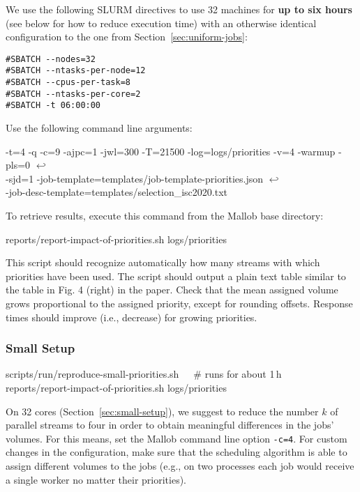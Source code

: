\documentclass[runningheads]{article}
\newcommand{\CR}{{\tiny$\hookleftarrow$}}
\numberwithin{dummy}{subsection}
\begin{document}
We use the following SLURM directives to use 32 machines for \textbf{up to six hours} (see below for how to reduce execution time) with an otherwise identical configuration to the one from Section~\ref{sec:uniform-jobs}:

\begin{verbatim}
#SBATCH --nodes=32
#SBATCH --ntasks-per-node=12
#SBATCH --cpus-per-task=8
#SBATCH --ntasks-per-core=2
#SBATCH -t 06:00:00
\end{verbatim}

Use the following command line arguments:

\begin{ttfenv}
-t=4 -q -c=9 -ajpc=1 -jwl=300 -T=21500 -log=logs/priorities -v=4 -warmup -pls=0 \CR\\
-sjd=1 -job-template=templates/job-template-priorities.json \CR\\
 -job-desc-template=templates/selection\_isc2020.txt
\end{ttfenv}

To retrieve results, execute this command from the Mallob base directory:
\begin{ttfenv}
reports/report-impact-of-priorities.sh logs/priorities
\end{ttfenv}

 This script should recognize automatically how many streams with which priorities have been used.
The script should output a plain text table similar to the table in Fig. 4 (right) in the paper.
Check that the mean assigned volume grows proportional to the assigned priority, except for rounding offsets.
Response times should improve (i.e., decrease) for growing priorities.

\subsubsection{Small Setup}

\begin{tcolorbox}[
  colback=Magenta!5!white,
  colframe=Magenta!75!black,
  title={\centering Commands for Small Setup (Section~\ref{sec:small-setup}) in a Nutshell}]
\begin{ttfenvcompact}
scripts/run/reproduce-small-priorities.sh\ \ \ \# runs for about 1\,h\\
reports/report-impact-of-priorities.sh logs/priorities
\end{ttfenvcompact}
\end{tcolorbox}

On 32 cores (Section~\ref{sec:small-setup}), we suggest to reduce the number $k$ of parallel streams to four in order to obtain meaningful differences in the jobs' volumes.
For this means, set the Mallob command line option \texttt{-c=4}.
For custom changes in the configuration, make sure that the scheduling algorithm is able to assign different volumes to the jobs (e.g., on two processes each job would receive a single worker no matter their priorities).
\end{document}
